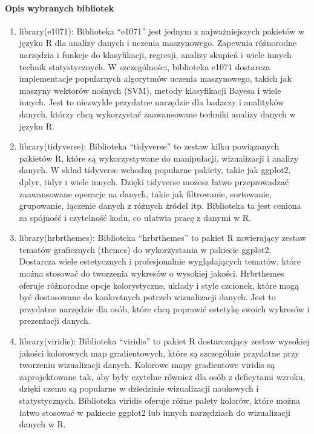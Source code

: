 \documentclass[
]{article}
\begin{document}
\hypertarget{opis-wybranych-bibliotek}{%
\paragraph{Opis wybranych bibliotek}\label{opis-wybranych-bibliotek}}

\begin{enumerate}
\def\labelenumi{\arabic{enumi}.}
\item
  library(e1071): Biblioteka ``e1071'' jest jednym z najważniejszych
  pakietów w języku R dla analizy danych i uczenia maszynowego. Zapewnia
  różnorodne narzędzia i funkcje do klasyfikacji, regresji, analizy
  skupień i wiele innych technik statystycznych. W szczególności,
  biblioteka e1071 dostarcza implementacje popularnych algorytmów
  uczenia maszynowego, takich jak maszyny wektorów nośnych (SVM), metody
  klasyfikacji Bayesa i wiele innych. Jest to niezwykle przydatne
  narzędzie dla badaczy i analityków danych, którzy chcą wykorzystać
  zaawansowane techniki analizy danych w języku R.
\item
  library(tidyverse): Biblioteka ``tidyverse'' to zestaw kilku
  powiązanych pakietów R, które są wykorzystywane do manipulacji,
  wizualizacji i analizy danych. W skład tidyverse wchodzą popularne
  pakiety, takie jak ggplot2, dplyr, tidyr i wiele innych. Dzięki
  tidyverse możesz łatwo przeprowadzać zaawansowane operacje na danych,
  takie jak filtrowanie, sortowanie, grupowanie, łączenie danych z
  różnych źródeł itp. Biblioteka ta jest ceniona za spójność i
  czytelność kodu, co ułatwia pracę z danymi w R.
\item
  library(hrbrthemes): Biblioteka ``hrbrthemes'' to pakiet R zawierający
  zestaw tematów graficznych (themes) do wykorzystania w pakiecie
  ggplot2. Dostarcza wiele estetycznych i profesjonalnie wyglądających
  tematów, które można stosować do tworzenia wykresów o wysokiej
  jakości. Hrbrthemes oferuje różnorodne opcje kolorystyczne, układy i
  style czcionek, które mogą być dostosowane do konkretnych potrzeb
  wizualizacji danych. Jest to przydatne narzędzie dla osób, które chcą
  poprawić estetykę swoich wykresów i prezentacji danych.
\item
  library(viridis): Biblioteka ``viridis'' to pakiet R dostarczający
  zestaw wysokiej jakości kolorowych map gradientowych, które są
  szczególnie przydatne przy tworzeniu wizualizacji danych. Kolorowe
  mapy gradientowe viridis są zaprojektowane tak, aby były czytelne
  również dla osób z deficytami wzroku, dzięki czemu są popularne w
  dziedzinie wizualizacji naukowych i statystycznych. Biblioteka viridis
  oferuje różne palety kolorów, które można łatwo stosować w pakiecie
  ggplot2 lub innych narzędziach do wizualizacji danych w R.
\end{enumerate}
\end{document}
